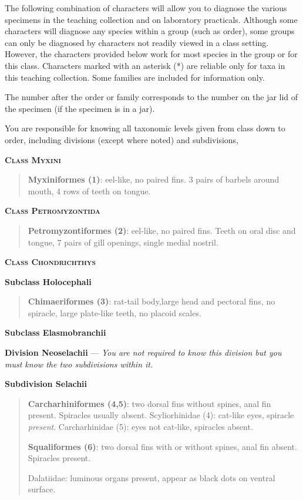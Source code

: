 \documentclass[12pt, hidelinks]{exam}
\begin{document}
The following combination of characters will allow you to
diagnose the various specimens in the teaching collection and on
laboratory practicals. Although some characters will diagnose any
species within a group (such as order), some groups can only be
diagnosed by characters not readily viewed in a class setting. However,
the characters provided below work for most species in the group or for
this class. Characters marked with an asterisk (*) are reliable only for taxa in this
teaching collection. Some families are included for information only. 

The number after the order or family corresponds to the number
on the jar lid of the specimen (if the specimen is in a jar).

You are responsible for knowing all taxonomic levels given from class down to order, including  divisions (except where noted) and subdivisions, 

\textbf{\textsc{Class Myxini}}


\begin{quote}
\textbf{Myxiniformes (1)}: eel-like, no paired fins. 3 pairs of barbels
around mouth, 4 rows of teeth on tongue.
\end{quote}

\textbf{\textsc{Class Petromyzontida}}

\begin{quote}
\textbf{Petromyzontiformes (2)}: eel-like, no paired fins. Teeth on oral
disc and tongue, 7 pairs of gill openings, single medial nostril.
\end{quote}

\textbf{\textsc{Class Chondrichthys}}

\textbf{Subclass Holocephali}

\begin{quote}
\textbf{Chimaeriformes (3)}: rat-tail body,large head and pectoral fins,
no spiracle, large plate-like teeth, no placoid scales.
\end{quote}

\textbf{Subclass Elasmobranchii}

\textbf{Division Neoselachii} — \textit{You are not required to know this division but you must know the two subdivisions within it.}

\textbf{Subdivision Selachii }

\begin{quote}
\textbf{Carcharhiniformes (4,5)}: two dorsal fins without spines, anal
fin present. Spiracles usually absent. Scyliorhinidae (4): cat-like
eyes, spiracle \emph{present}. Carcharhinidae (5): eyes not cat-like,
spiracles absent.

\textbf{Squaliformes (6)}: two dorsal fins with or without spines, anal
fin absent. Spiracles present.

Dalatiidae: luminous organs present, appear as black dots on ventral
surface.
\end{quote}
\end{document}
